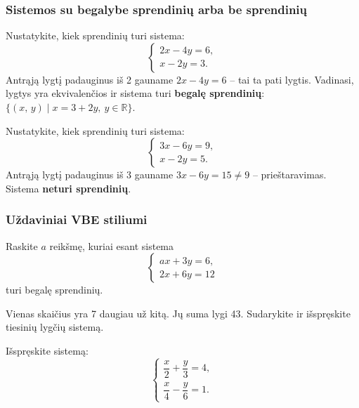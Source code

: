 \subsubsection*{Sistemos su begalybe sprendinių arba be sprendinių}

\begin{example}
Nustatykite, kiek sprendinių turi sistema:
\[
  \begin{cases}
    2x - 4y = 6,\\
    x - 2y = 3.
  \end{cases}
\]
Antrąją lygtį padauginus iš 2 gauname $2x - 4y = 6$ -- tai ta pati lygtis. Vadinasi, lygtys yra ekvivalenčios ir sistema turi \textbf{begalę sprendinių}: $\{(x,\,y) \mid x = 3 + 2y,\ y \in \mathbb{R}\}$.
\end{example}

\begin{example}
Nustatykite, kiek sprendinių turi sistema:
\[
  \begin{cases}
    3x - 6y = 9,\\
    x - 2y = 5.
  \end{cases}
\]
Antrąją lygtį padauginus iš 3 gauname $3x - 6y = 15 \neq 9$ -- prieštaravimas. Sistema \textbf{neturi sprendinių}.
\end{example}

\subsubsection*{Uždaviniai VBE stiliumi}

\begin{exercise}
Raskite $a$ reikšmę, kuriai esant sistema
\[
  \begin{cases}
    ax + 3y = 6,\\
    2x + 6y = 12
  \end{cases}
\]
turi begalę sprendinių.
\end{exercise}

\begin{exercise}
Vienas skaičius yra 7 daugiau už kitą. Jų suma lygi 43. Sudarykite ir išspręskite tiesinių lygčių sistemą.
\end{exercise}

\begin{exercise}
Išspręskite sistemą:
\[
  \begin{cases}
    \dfrac{x}{2} + \dfrac{y}{3} = 4,\\[6pt]
    \dfrac{x}{4} - \dfrac{y}{6} = 1.
  \end{cases}
\]
\end{exercise}


